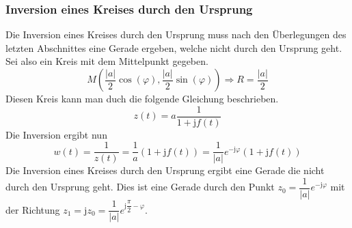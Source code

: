\subsubsection{Inversion eines Kreises durch den Ursprung}
Die Inversion eines Kreises durch den Ursprung muss nach den Überlegungen des letzten Abschnittes eine Gerade ergeben, welche nicht durch den Ursprung geht. Sei also ein Kreis mit dem Mittelpunkt gegeben.
\begin{equation}
\boxed{M\left(\dfrac{\Big\vert a\Big\vert}{2}\cos\left(\varphi\right), \dfrac{\Big\vert a\Big\vert}{2}\sin\left(\varphi\right)\right)\Rightarrow R=\dfrac{\Big\vert a\Big\vert}{2}}
\end{equation}
Diesen Kreis kann man duch die folgende Gleichung beschrieben.
\begin{equation}
\boxed{z\left(t\right)=a\dfrac{1}{1+\text{j}f\left(t\right)}}
\end{equation}
Die Inversion ergibt nun
\begin{equation}
\boxed{w\left(t\right)=\dfrac{1}{z\left(t\right)}=\dfrac{1}{a}\left(1+\text{j}f\left(t\right)\right)=\dfrac{1}{\Big\vert a\Big\vert}e^{-\text{j}\varphi}\left(1+\text{j}f\left(t\right)\right)}
\end{equation}
Die Inversion eines Kreises durch den Ursprung ergibt eine Gerade die nicht durch den Ursprung geht. Dies ist eine Gerade durch den Punkt $z_0=\dfrac{1}{\Big\vert a\Big\vert}e^{-\text{j}\varphi}$ mit der Richtung $z_1=\text{j}z_0=\dfrac{1}{\Big\vert a\Big\vert}e^{\text{j}\dfrac{\pi}{2}-\varphi}$.
